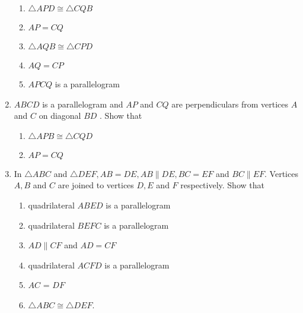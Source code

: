 \begin{enumerate}[label=\thesection.\arabic*.,ref=\thesection.\theenumi]
\begin{enumerate}
 \item  $\triangle  APD  \cong   \triangle  CQB$ 
\item $AP = CQ$ \item  $\triangle  AQB  \cong   \triangle  CPD$ 
\item $AQ = CP$ 
\item $APCQ$ is a parallelogram
\end{enumerate}
\item $ABCD$ is a parallelogram and $AP$ and $CQ$ are perpendiculars from vertices $A$ and $C$ on diagonal $BD$ . Show that 
\begin{enumerate} 
\item  $\triangle  APB  \cong   \triangle  CQD $ 
\item $AP = CQ$
\end{enumerate}
%
\item In  $\triangle  ABC$ and  $\triangle  DEF, AB = DE, AB  \parallel  DE, BC = EF$ and $BC  \parallel  EF$. Vertices $A, B$ and $C$ are joined to vertices $D, E$ and $F$ respectively. Show that 
\begin{enumerate}
\item quadrilateral $ABED$ is a parallelogram 
\item quadrilateral $BEFC$ is a parallelogram 
\item $AD  \parallel  CF$ and $AD = CF$ 
\item quadrilateral $ACFD$ is a parallelogram 
\item $AC$ = $DF$ 
\item  $\triangle  ABC  \cong   \triangle  DEF$.
%
\end{enumerate}


\end{enumerate}
